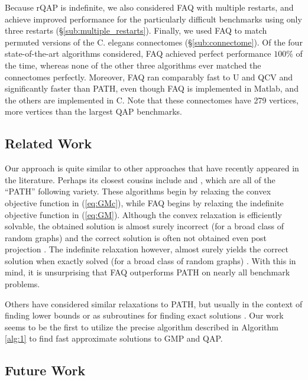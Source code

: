 \documentclass[10pt]{article}
\begin{document}
Because rQAP is indefinite, we also considered FAQ with multiple restarts, and achieve improved performance for the particularly difficult benchmarks using only three restarts (\S \ref{sub:multiple_restarts}).    
Finally, we used FAQ to match permuted versions of the C. elegans connectomes (\S \ref{sub:connectome}). Of the four state-of-the-art algorithms considered, FAQ achieved perfect performance $100\%$ of the time, whereas none of the other three algorithms ever matched the connectomes perfectly.  Moreover, FAQ ran comparably fast to U and QCV and significantly faster than PATH, even though FAQ is implemented in Matlab, and the others are implemented in C.  Note that these connectomes have 279 vertices, more vertices than the largest QAP benchmarks. 



\subsection{Related Work}


Our approach is quite similar to other approaches that have recently appeared in the literature.  Perhaps its closest cousins include \cite{Zaslavskiy2009, Zaslavskiy2010} and \cite{Escolano2011}, which are all of the ``PATH'' following variety.  These algorithms begin by relaxing the convex objective function in (\ref{eq:GMc}), while FAQ begins by relaxing the indefinite objective function in (\ref{eq:GM}). 
Although the convex relaxation is efficiently solvable, the obtained solution is almost surely incorrect (for a broad class of random graphs)
 and the correct solution is often not obtained even post projection \cite{lyzinski2014graph}.  The indefinite relaxation however, almost surely yields the correct solution when exactly solved (for a broad class of random graphs) 
 \cite{lyzinski2014graph}.  %
With this in mind, it is unsurprising that FAQ outperforms PATH on nearly all benchmark problems.  

Others have considered similar relaxations to PATH, but usually in the context of finding lower bounds  \cite{Anstreicher2001} or as subroutines for finding exact solutions \cite{Brixius2000}.  Our work seems to be the first to utilize the precise algorithm described in Algorithm \ref{alg:1} to find fast approximate solutions to GMP and QAP.


\subsection{Future Work}
\end{document}
